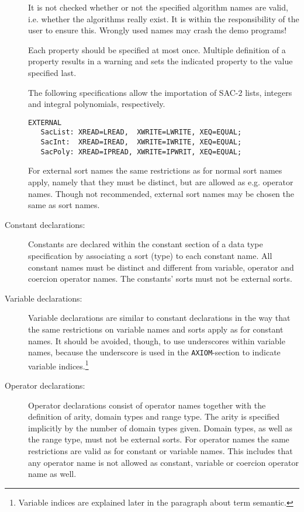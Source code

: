 \begin{description}
It is not checked whether or not the specified algorithm names are valid,
i.e. whether the algorithms really exist. 
It is within the responsibility of the user to ensure this.
Wrongly used names may crash the demo programs!

Each property should be specified at most once. Multiple definition of a property
results in a warning and sets the indicated property to the value specified last.

\begin{example}
{\rm The following specifications allow the importation of SAC-2 lists,
integers and integral polynomials, respectively.
\begin{verbatim}
EXTERNAL
   SacList: XREAD=LREAD,  XWRITE=LWRITE, XEQ=EQUAL;
   SacInt:  XREAD=IREAD,  XWRITE=IWRITE, XEQ=EQUAL;
   SacPoly: XREAD=IPREAD, XWRITE=IPWRIT, XEQ=EQUAL;
\end{verbatim}
} %
\end{example}

For external sort names the same restrictions as for normal sort names
apply, namely that they must be distinct, but are allowed as e.g. 
operator names. Though not recommended, external sort names may be
chosen the same as sort names.

\item[Constant declarations:]
Constants are declared within the constant section of a data type
specification by associating a sort (type) to each constant name.
All constant names must be distinct and different from variable,
operator and coercion operator names. The constants' sorts must not
be external sorts.

\item[Variable declarations:]
Variable declarations are similar to constant declarations in the way
that the same restrictions on variable names and sorts apply as for constant names.
It should be avoided, though, to use underscores within variable names,
because the underscore is used in the {\tt AXIOM}-section
to indicate variable indices.\footnote{Variable indices are explained
later in the paragraph about term semantic.}

\item[Operator declarations:]
Operator declarations consist of operator names together with the definition
of arity, domain types and range type. The arity is specified implicitly
by the number of domain types given. Domain types, as well as the range
type, must not be external sorts. For operator names the same restrictions
are valid as for constant or variable names. This includes that any
operator name is not allowed as constant, variable or coercion operator
name as well.


\end{description}

